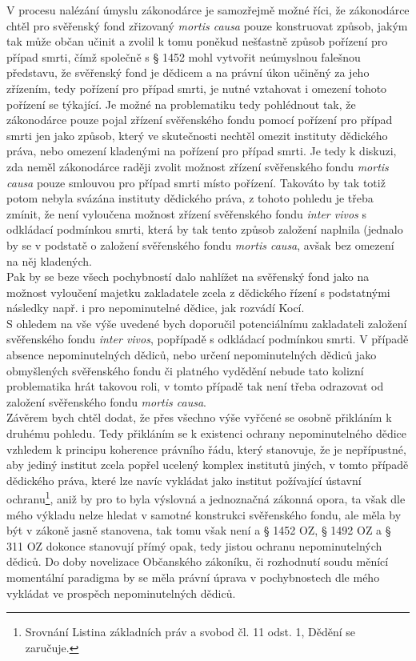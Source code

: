 \documentclass{article}
\begin{document}
V procesu nalézání úmyslu zákonodárce je samozřejmě možné říci, že zákonodárce chtěl pro svěřenský fond zřizovaný \textit{mortis causa} pouze konstruovat způsob, jakým tak může občan učinit a zvolil k tomu poněkud nešťastně způsob pořízení pro případ smrti, čímž společně s § 1452 mohl vytvořit neúmyslnou falešnou představu, že svěřenský fond je dědicem a na právní úkon učiněný za jeho zřízením, tedy pořízení pro případ smrti, je nutné vztahovat i omezení tohoto pořízení se týkající. Je možné na problematiku tedy pohlédnout tak, že zákonodárce pouze pojal zřízení svěřenského fondu pomocí pořízení pro případ smrti jen jako způsob, který ve skutečnosti nechtěl omezit instituty dědického práva, nebo omezení kladenými na pořízení pro případ smrti. Je tedy k diskuzi, zda neměl zákonodárce raději zvolit možnost zřízení svěřenského fondu \textit{mortis causa} pouze smlouvou pro případ smrti místo pořízení. Takováto by tak totiž potom nebyla svázána instituty dědického práva, z tohoto pohledu je třeba zmínit, že není vyloučena možnost zřízení svěřenského fondu \textit{inter vivos} s odkládací podmínkou smrti, která by tak tento způsob založení naplnila (jednalo by se v podstatě o založení svěřenského fondu \textit{mortis causa}, avšak bez omezení na něj kladených.\\

Pak by se beze všech pochybností dalo nahlížet na svěřenský fond jako na možnost vyloučení majetku zakladatele zcela z dědického řízení s podstatnými následky např. i pro nepominutelné dědice, jak rozvádí Kocí.\\

S ohledem na vše výše uvedené bych doporučil potenciálnímu zakladateli založení svěřenského fondu \textit{inter vivos}, popřípadě s odkládací podmínkou smrti. V případě absence nepominutelných dědiců, nebo určení nepominutelných dědiců jako obmyšlených svěřenského fondu či platného vydědění nebude tato kolizní problematika hrát takovou roli, v tomto případě tak není třeba odrazovat od založení svěřenského fondu \textit{mortis causa}.\\

Závěrem bych chtěl dodat, že přes všechno výše vyřčené se osobně přikláním k druhému pohledu. Tedy přikláním se k existenci ochrany nepominutelného dědice vzhledem k principu koherence právního řádu, který stanovuje, že je nepřípustné, aby jediný institut zcela popřel ucelený komplex institutů jiných, v tomto případě dědického práva, které lze navíc vykládat jako institut požívající ústavní ochranu\footnote{Srovnání Listina základních práv a svobod čl. 11 odst. 1, Dědění se zaručuje.}, aniž by pro to byla výslovná a jednoznačná zákonná opora, ta však dle mého výkladu nelze hledat v samotné konstrukci svěřenského fondu, ale měla by být v zákoně jasně stanovena, tak tomu však není a § 1452 OZ, § 1492 OZ a § 311 OZ dokonce stanovují přímý opak, tedy jistou ochranu nepominutelných dědiců. Do doby novelizace Občanského zákoníku, či rozhodnutí soudu měnící momentální paradigma by se měla právní úprava v pochybnostech dle mého vykládat ve prospěch nepominutelných dědiců.\\
\end{document}
